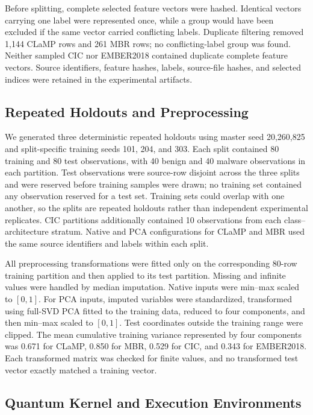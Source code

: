 \documentclass[letterpaper]{article} %
\begin{document}
Before splitting, complete selected feature vectors were hashed. Identical vectors carrying one label were represented once, while a group would have been excluded if the same vector carried conflicting labels. Duplicate filtering removed 1,144 CLaMP rows and 261 MBR rows; no conflicting-label group was found. Neither sampled CIC nor EMBER2018 contained duplicate complete feature vectors. Source identifiers, feature hashes, labels, source-file hashes, and selected indices were retained in the experimental artifacts.

\subsection{Repeated Holdouts and Preprocessing}

We generated three deterministic repeated holdouts using master seed 20,260,825 and split-specific training seeds 101, 204, and 303. Each split contained 80 training and 80 test observations, with 40 benign and 40 malware observations in each partition. Test observations were source-row disjoint across the three splits and were reserved before training samples were drawn; no training set contained any observation reserved for a test set. Training sets could overlap with one another, so the splits are repeated holdouts rather than independent experimental replicates. CIC partitions additionally contained 10 observations from each class--architecture stratum. Native and PCA configurations for CLaMP and MBR used the same source identifiers and labels within each split.

All preprocessing transformations were fitted only on the corresponding 80-row training partition and then applied to its test partition. Missing and infinite values were handled by median imputation. Native inputs were min--max scaled to $[0,1]$. For PCA inputs, imputed variables were standardized, transformed using full-SVD PCA fitted to the training data, reduced to four components, and then min--max scaled to $[0,1]$. Test coordinates outside the training range were clipped. The mean cumulative training variance represented by four components was 0.671 for CLaMP, 0.850 for MBR, 0.529 for CIC, and 0.343 for EMBER2018. Each transformed matrix was checked for finite values, and no transformed test vector exactly matched a training vector.

\subsection{Quantum Kernel and Execution Environments}
\end{document}
